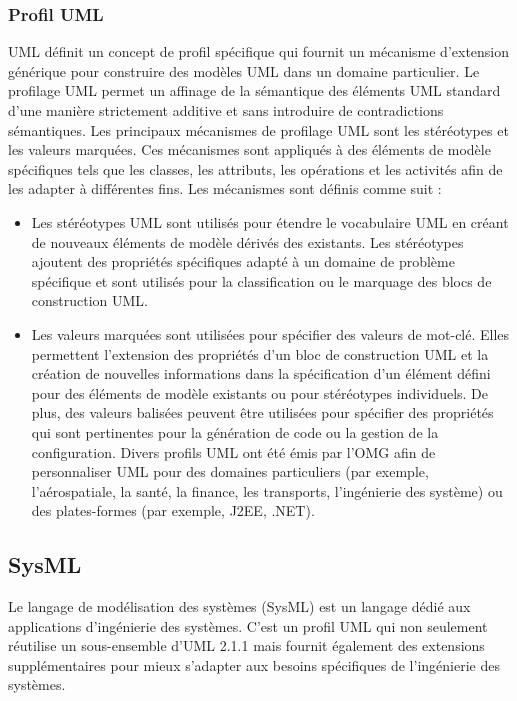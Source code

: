 \documentclass[french]{spimufcphdthesis}
\begin{document}
\subsubsection{Profil UML}

 UML définit un concept de profil spécifique qui fournit un mécanisme d'extension générique pour construire des modèles UML dans un domaine particulier. Le profilage UML permet un affinage de la sémantique des éléments UML standard d'une manière strictement additive et sans introduire de contradictions sémantiques.
Les principaux mécanismes de profilage UML sont les stéréotypes et les valeurs marquées. Ces mécanismes sont appliqués à des éléments de modèle spécifiques tels que les classes, les attributs, les opérations et les activités afin de les adapter à différentes fins. Les mécanismes sont définis comme suit :

\begin{itemize}[label=\textbullet, font=\LARGE]
\item Les stéréotypes UML sont utilisés pour étendre le vocabulaire UML en créant de nouveaux éléments de modèle dérivés des existants. Les stéréotypes ajoutent des propriétés spécifiques adapté à un domaine de problème spécifique et sont utilisés pour la classification ou le marquage des blocs de construction UML.

\item Les valeurs marquées sont utilisées pour spécifier des valeurs de mot-clé. Elles permettent l'extension des propriétés d'un bloc de construction UML et la création de nouvelles informations dans la spécification d'un élément défini pour des éléments de modèle existants ou pour stéréotypes individuels. De plus, des valeurs balisées peuvent être utilisées pour spécifier des propriétés qui sont pertinentes pour la génération de code ou la gestion de la configuration.
Divers profils UML ont été émis par l'OMG afin de personnaliser UML pour des domaines particuliers (par exemple, l'aérospatiale, la santé, la finance, les transports, l’ingénierie des système) ou des plates-formes (par exemple, J2EE, .NET).
\end{itemize}


\subsection{SysML}

 Le langage de modélisation des systèmes (SysML) est un langage dédié aux applications d'ingénierie des systèmes. C'est un profil UML qui non seulement réutilise un sous-ensemble d'UML 2.1.1 mais fournit également des extensions supplémentaires pour mieux s'adapter aux besoins spécifiques de l'ingénierie des systèmes. 
\end{document}
